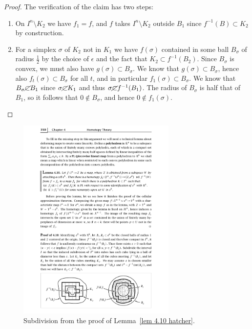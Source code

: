 \begin{proof}
    The verification of the claim has two steps:
    \begin{enumerate}[label=(\arabic*)]
        \item On $I^n\setminus K_2$ we have $f_1=f$, and $f$ takes $I^n\setminus K_2$ outside $B_1$ since $f^{-1}(B)\subset K_2$ by construction.
        \item For a simplex $\sigma$ of $K_2$ not in $K_1$ we have $f(\sigma)$ contained in some ball $B_\sigma$ of radius $\frac 12$ by the choice of $\epsilon$ and the fact that $K_2\subset f^{-1}(B_2)$. Since $B_\sigma$ is convex, we must also have $g(\sigma)\subset B_\sigma$. We know that $g(\sigma)\subset B_\sigma$, hence also $f_t(\sigma)\subset B_\sigma$ for all $t$, and in particular $f_1(\sigma)\subset B_\sigma$. We know that $B_\sigma\cancel{\subset} B_1$ since $\sigma\cancel{\subset}K_1$ and thus $\sigma\cancel{\subset}f^{-1}(B_1)$. The radius of $B_\sigma$ is half that of $B_1$, so it follows that $0\notin B_\sigma$, and hence $0\notin f_1(\sigma)$.
    \end{enumerate}
\end{proof}

\begin{figure}[tp]
    \centering
    \includegraphics[width=0.7\textwidth]{figures/cell_approx.pdf}
    \caption{Subdivision from the proof of Lemma~\ref{lem 4.10 hatcher}.}
    \label{fig:cell_approx}
\end{figure}


